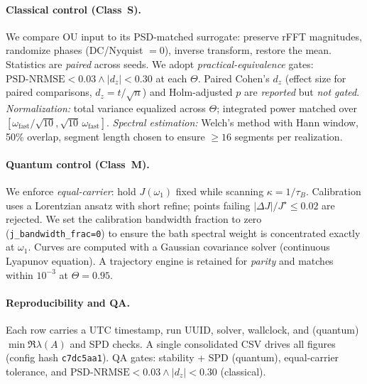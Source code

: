 \documentclass[11pt,letterpaper]{article}
\newcommand{\confighash}{c7dc5aa1}
\DeclareRobustCommand{\classS}{\textbf{Class~S}\xspace}
\DeclareRobustCommand{\classM}{\textbf{Class~M}\xspace}
\DeclareRobustCommand{\GatePSD}{\ensuremath{\text{PSD-NRMSE}<0.03}\xspace}
\DeclareRobustCommand{\GateDZ}{\ensuremath{\lvert d_z\rvert<0.30}\xspace}
\DeclareRobustCommand{\GateEQ}{\ensuremath{\GatePSD \wedge \GateDZ}\xspace}
\begin{document}
\paragraph*{Classical control (\classS).}
We compare OU input to its PSD-matched surrogate: preserve rFFT magnitudes, randomize phases (DC/Nyquist $=0$), inverse transform, restore the mean. Statistics are \emph{paired} across seeds. We adopt \emph{practical-equivalence} gates: \GateEQ{} at each $\Theta$. Paired Cohen's $d_z$ (effect size for paired comparisons, $d_z=t/\sqrt{n}$) and Holm-adjusted $p$ are \emph{reported} but \emph{not gated}. \emph{Normalization:} total variance equalized across $\Theta$; integrated power matched over $[\omega_{\mathrm{fast}}/\sqrt{10},\sqrt{10}\,\omega_{\mathrm{fast}}]$. \emph{Spectral estimation:} Welch's method with Hann window, 50\% overlap, segment length chosen to ensure $\ge 16$ segments per realization.

\paragraph*{Quantum control (\classM).}
We enforce \emph{equal-carrier}: hold $J(\omega_1)$ fixed while scanning $\kappa=1/\tau_B$. Calibration uses a Lorentzian ansatz with short refine; points failing $|\Delta J|/J^\star\le 0.02$ are rejected. We set the calibration bandwidth fraction to zero (\texttt{j\_bandwidth\_frac=0}) to ensure the bath spectral weight is concentrated exactly at $\omega_1$. Curves are computed with a Gaussian covariance solver (continuous Lyapunov equation). A trajectory engine is retained for \emph{parity} and matches within $10^{-3}$ at $\Theta=0.95$.

\paragraph*{Reproducibility and QA.}
Each row carries a UTC timestamp, run UUID, solver, wallclock, and (quantum) $\min \Re \lambda(A)$ and SPD checks. A single consolidated CSV drives all figures (config hash \texttt{\confighash}). QA gates: stability + SPD (quantum), equal-carrier tolerance, and \GateEQ{} (classical).
\end{document}
